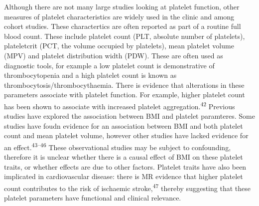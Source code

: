 \documentclass[11pt,twoside]{bristolthesis}
\begin{document}
Although there are not many large studies looking at platelet function, other measures of platelet characteristics are widely used in the clinic and among cohort studies. These charactertics are often reported as part of a routine full blood count. These include platelet count (PLT, absolute number of platelets), plateletcrit (PCT, the volume occupied by platelets), mean platelet volume (MPV) and platelet distribution width (PDW). These are often used as diagnostic tools, for example a low platelet count is demonstrative of thrombocytopenia and a high platelet count is known as thrombocytosis/thrombocythaemia. There is evidence that alterations in these parameters associate with platelet function. For example, higher platelet count has been shown to associate with increased platelet aggregation.\textsuperscript{42} Previous studies have explored the association between BMI and platelet paramteres. Some studies have foudn evidence for an association between BMI and both platelet count and mean platelet volume, however other studies have lacked evidence for an effect.\textsuperscript{43--46} These observational studies may be subject to confounding, therefore it is unclear whether there is a causal effect of BMI on these platelet traits, or whether effects are due to other factors. Platelet traits have also been implicated in cardiovascular disease: there is MR evidence that higher platelet count contributes to the risk of ischaemic stroke,\textsuperscript{47} thereby suggesting that these platelet parameters have functional and clinical relevance.
\end{document}
